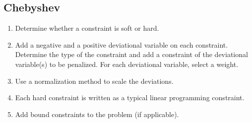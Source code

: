 \documentclass[twoside,twocolumn]{article}
\begin{document}
\subsection{Chebyshev}

\begin{enumerate}
	\item Determine whether a constraint is soft or hard.
	\item Add a negative and a positive deviational variable on each constraint. Determine the type of the constraint and add a constraint of the deviational variable(s) to be penalized. For each deviational variable, select a weight. 
	\item Use a normalization method to scale the deviations.
	\item Each hard constraint is written as a typical linear programming constraint.
	\item Add bound constraints to the problem (if applicable).
\end{enumerate}
\end{document}
